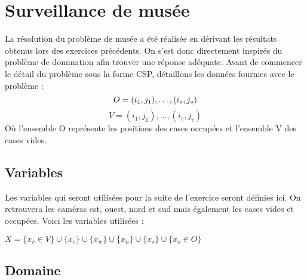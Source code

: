 \documentclass[a4paper]{article}
\begin{document}
\section{Surveillance de musée}
La résolution du problème de musée a été réalisée en dérivant les résultats obtenus lors des exercices précédents. On s'est donc directement inspirés du problème de domination afin trouver une réponse adéquate. Avant de commencer le détail du problème sous la forme CSP, détaillons les données fournies avec le problème : 
\begin{equation}
O = {(i_1,j_1),\ldots,(i_o,j_o)} \vspace{0.1cm} 
\end{equation}
\begin{equation}
V = {(i_1,j_1),\ldots,(i_v,j_v)}
\end{equation}
Où l'ensemble O représente les positions des cases occupées et l'ensemble V des cases vides.
\subsection{Variables}
Les variables qui seront utilisées pour la suite de l'exercice seront définies ici. On retrouvera les caméras est, ouest, nord et sud mais également les cases vides et occupées. Voici les variables utilisées : 
\begin{center}
$ X = \{x_v \in V \} \cup \{x_e\} \cup \{x_w\} \cup \{x_n\} \cup \{x_s\} \cup \{x_o \in O\} $
\end{center}
\subsection{Domaine}
\end{document}
